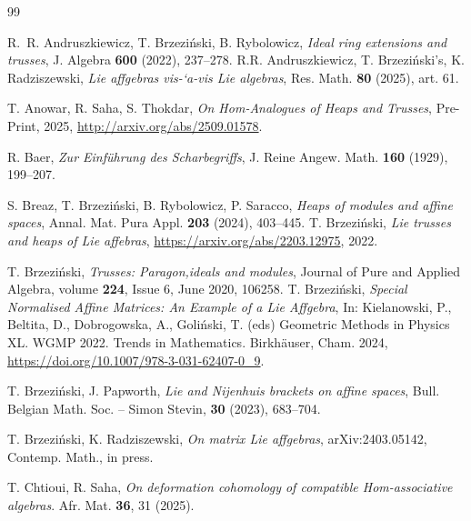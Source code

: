 \documentclass[14pt]{article}
\theoremstyle{Definition}
\theoremstyle{remark}
\begin{document}
\begin{thebibliography}{99}

R.~R. Andruszkiewicz, T. Brzezi\'nski, B. Rybolowicz,
\textit{Ideal ring extensions and trusses},
J. Algebra \textbf{600} (2022), 237--278.
R.R. Andruszkiewicz, T. Brzezi\'nski's, K. Radziszewski, \textit{Lie affgebras vis-`a-vis Lie algebras}, Res. Math. \textbf{80} (2025), art. 61.

T. Anowar, R. Saha, S. Thokdar, \textit{On Hom-Analogues of Heaps and Trusses}, Pre-Print, 2025, \url{http://arxiv.org/abs/2509.01578}.

R. Baer,
\textit{Zur Einf\"uhrung des Scharbegriffs},
J. Reine Angew. Math. \textbf{160} (1929), 199--207.

S. Breaz, T. Brzezi\'nski, B. Rybolowicz, P. Saracco,
\textit{Heaps of modules and affine spaces},
Annal. Mat. Pura Appl. \textbf{203} (2024), 403--445.
T. Brzezi\'nski,
\textit{Lie trusses and heaps of Lie affebras}, \url{https://arxiv.org/abs/2203.12975}, 2022.

T. Brzezi\'nski,
\textit{Trusses: Paragon,ideals and modules}, Journal of Pure and Applied Algebra, volume \textbf{224}, Issue 6, June 2020, 106258.
T. Brzezi\'nski, \textit{Special Normalised Affine Matrices: An Example of a Lie Affgebra}, In: Kielanowski, P., Beltita, D., Dobrogowska, A., Goliński, T. (eds) Geometric Methods in Physics XL. WGMP 2022. Trends in Mathematics. Birkhäuser, Cham. 2024, \url{https://doi.org/10.1007/978-3-031-62407-0_9}.

T. Brzezi\'nski, J. Papworth,
\textit{Lie and Nijenhuis brackets on affine spaces},
Bull. Belgian Math. Soc. -- Simon Stevin, \textbf{30} (2023), 683--704.

T. Brzezi\'nski, K. Radziszewski,
\textit{On matrix Lie affgebras},
arXiv:2403.05142, Contemp. Math., in press.



T. Chtioui, R. Saha, \textit{On deformation cohomology of compatible Hom-associative algebras}. Afr. Mat. \textbf{36}, 31 (2025).


\end{thebibliography}
\end{document}
